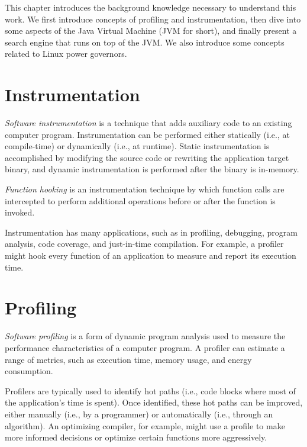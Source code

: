 \label{cap:background}

This chapter introduces the background knowledge necessary to understand this work. We first introduce concepts of profiling and instrumentation, then dive into some aspects of the Java Virtual Machine (JVM for short), and finally present a search engine that runs on top of the JVM. We also introduce some concepts related to Linux power governors.

\section{Instrumentation}

\emph{Software instrumentation} is a technique that adds auxiliary code to an existing computer program. Instrumentation can be performed either statically (i.e., at compile-time) or dynamically (i.e., at runtime). Static instrumentation is accomplished by modifying the source code or rewriting the application target binary, and dynamic instrumentation is performed after the binary is in-memory.

\emph{Function hooking} is an instrumentation technique by which function calls are intercepted to perform additional operations before or after the function is invoked.

Instrumentation has many applications, such as in profiling, debugging, program analysis, code coverage, and just-in-time compilation. For example, a profiler might hook every function of an application to measure and report its execution time.


\section{Profiling}

\emph{Software profiling} is a form of dynamic program analysis used to measure the performance characteristics of a computer program. A profiler can estimate a range of metrics, such as execution time, memory usage, and energy consumption.

Profilers are typically used to identify hot paths (i.e., code blocks where most of the application's time is spent). Once identified, these hot paths can be improved, either manually (i.e., by a programmer) or automatically (i.e., through an algorithm). An optimizing compiler, for example, might use a profile to make more informed decisions or optimize certain functions more aggressively.

